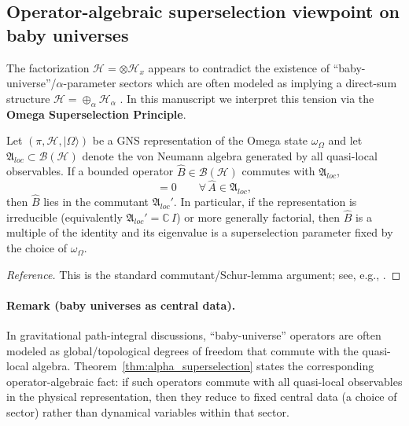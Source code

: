 \subsection{Operator-algebraic superselection viewpoint on baby universes}
\label{app:baby_universes}
The factorization $\mathcal{H} = \otimes \mathcal{H}_x$ appears to contradict the existence of ``baby-universe''/$\alpha$-parameter sectors which are often modeled as implying a direct-sum structure $\mathcal{H} = \oplus_\alpha \mathcal{H}_\alpha$ \cite{MarolfMaxfield2020}. In this manuscript we interpret this tension via the \textbf{Omega Superselection Principle}.

\begin{theorem}
\label{thm:alpha_superselection}
Let $(\pi,\mathcal{H},|\Omega\rangle)$ be a GNS representation of the Omega state $\omega_\Omega$ and let $\mathfrak{A}_{loc}\subset\mathcal{B}(\mathcal{H})$ denote the von Neumann algebra generated by all quasi-local observables. If a bounded operator $\hat{B}\in\mathcal{B}(\mathcal{H})$ commutes with $\mathfrak{A}_{loc}$,
\begin{equation}
    [\hat{B}, \hat{A}] = 0\qquad \forall\,\hat{A}\in\mathfrak{A}_{loc},
\end{equation}
\noindent
then $\hat{B}$ lies in the commutant $\mathfrak{A}_{loc}'$. In particular, if the representation is irreducible (equivalently $\mathfrak{A}_{loc}'=\mathbb{C}\,I$) or more generally factorial, then $\hat{B}$ is a multiple of the identity and its eigenvalue is a superselection parameter fixed by the choice of $\omega_\Omega$.
\end{theorem}
\begin{proof}[Reference]
This is the standard commutant/Schur-lemma argument; see, e.g., \cite{Takesaki2002}.
\end{proof}
\paragraph{Remark (baby universes as central data).}
In gravitational path-integral discussions, ``baby-universe'' operators are often modeled as global/topological degrees of freedom that commute with the quasi-local algebra. Theorem~\ref{thm:alpha_superselection} states the corresponding operator-algebraic fact: if such operators commute with all quasi-local observables in the physical representation, then they reduce to fixed central data (a choice of sector) rather than dynamical variables within that sector.

